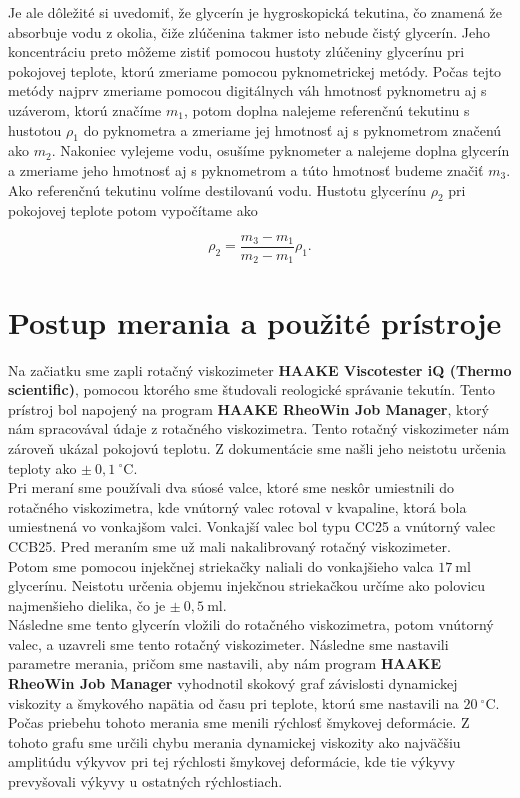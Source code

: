 \documentclass{prepareprotokol} %
\begin{document}
Je ale dôležité si uvedomiť, že glycerín je hygroskopická tekutina, čo znamená že absorbuje vodu z okolia, čiže zlúčenina takmer isto nebude čistý glycerín. 
Jeho koncentráciu preto môžeme zistiť pomocou hustoty zlúčeniny glycerínu pri pokojovej teplote, ktorú zmeriame pomocou pyknometrickej metódy. 
Počas tejto metódy najprv zmeriame pomocou digitálnych váh hmotnosť pyknometru aj s uzáverom, ktorú značíme $m_1$, potom doplna nalejeme referenčnú tekutinu s hustotou $\rho_1$ do pyknometra a zmeriame jej hmotnosť aj s pyknometrom značenú ako $m_2$.
Nakoniec vylejeme vodu, osušíme pyknometer a nalejeme doplna glycerín a zmeriame jeho hmotnosť aj s pyknometrom a túto hmotnosť budeme značiť $m_3$. 
Ako referenčnú tekutinu volíme destilovanú vodu.
Hustotu glycerínu $\rho_2$ pri pokojovej teplote potom vypočítame ako 

\begin{equation}
		  \rho_2 = \frac{m_3-m_1}{m_2-m_1}\rho_1.
		\label{eq:Pyknometer}
\end{equation} 



\section*{Postup merania a použité prístroje}
        
 Na začiatku sme zapli rotačný viskozimeter \textbf{HAAKE Viscotester iQ (Thermo scientific)}, pomocou ktorého sme študovali reologické správanie tekutín. 
 Tento prístroj bol napojený na program \textbf{HAAKE RheoWin Job Manager}, ktorý nám spracovával údaje z rotačného viskozimetra. 
 Tento rotačný viskozimeter nám zároveň ukázal pokojovú teplotu. 
 Z dokumentácie sme našli jeho neistotu určenia teploty ako $\pm~0,1~^\circ \mathrm{C}$. \\

Pri meraní sme používali dva súosé valce, ktoré sme neskôr umiestnili do rotačného viskozimetra, kde vnútorný valec rotoval v kvapaline, ktorá bola umiestnená vo vonkajšom valci. 
Vonkajší valec bol typu CC25 a vnútorný valec CCB25.
Pred meraním sme už mali nakalibrovaný rotačný viskozimeter. \\

Potom sme pomocou injekčnej striekačky naliali do vonkajšieho valca $17~\mathrm{ml}$ glycerínu. 
Neistotu určenia objemu injekčnou striekačkou určíme ako polovicu najmenšieho dielika, čo je $\pm~ 0,5~\mathrm{ml}$.\\

Následne sme tento glycerín vložili do rotačného viskozimetra, potom vnútorný valec, a uzavreli sme tento rotačný viskozimeter. 
Následne sme nastavili parametre merania, pričom sme nastavili, aby nám program \textbf{HAAKE RheoWin Job Manager} vyhodnotil skokový graf závislosti dynamickej viskozity a šmykového napätia od času pri teplote, ktorú sme nastavili na $20~^\circ \mathrm{C}$. 
Počas priebehu tohoto merania sme menili rýchlosť šmykovej deformácie. 
Z tohoto grafu sme určili chybu merania dynamickej viskozity ako najväčšiu amplitúdu výkyvov pri tej rýchlosti šmykovej deformácie, kde tie výkyvy prevyšovali výkyvy u ostatných rýchlostiach.\\
\end{document}
